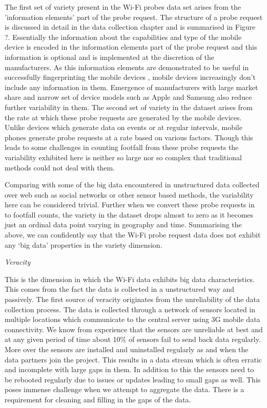 The first set of variety present in the Wi-Fi probes data set arises from the 'information elements' part of the probe request.
The structure of a probe request is discussed in detail in the data collection chapter and is summarised in Figure ?.
Essentially the information about the capabilities and type of the mobile device is encoded in the information elements part of the probe request and this information is optional and is implemented at the discretion of the manufacturers.
As this information elements are demonstrated to be useful in successfully fingerprinting the mobile devices \cite{vanhoef2016}, mobile devices increasingly don't include any information in them.
Emergence of manufacturers with large market share and narrow set of device models such as Apple and Samsung also reduce further variability in them.
The second set of variety in the dataset arises from the rate at which these probe requests are generated by the mobile devices. 
Unlike devices which generate data on events or at regular intervals, mobile phones generate probe requests at a rate based on various factors.
Though this leads to some challenges in counting footfall from these probe requests the variability exhibited here is neither so large nor so complex that traditional methods could not deal with them.

Comparing with some of the big data encountered in unstructured data collected over web such as social networks or other sensor based methods, the variability here can be considered trivial.
Further when we convert these probe requests in to footfall counts, the variety in the dataset drops almost to zero as it becomes just an ordinal data point varying in geography and time.
Summarising the above, we can confidently say that the Wi-Fi probe request data does not exhibit any `big data' properties in the variety dimension.


\vspace{1.5em}\noindent\textit{Veracity}\vspace{0.5em}

This is the dimension in which the Wi-Fi data exhibits big data characteristics.
This comes from the fact the data is collected in a unstructured way and passively.
The first source of veracity originates from the unreliability of the data collection process.
The data is collected through a network of sensors located in multiple locations which communicate to the central server using 3G mobile data connectivity.
We know from experience that the sensors are unreliable at best and at any given period of time about 10\% of sensors fail to send back data regularly.
More over the sensors are installed and uninstalled regularly as and when the data partners join the project.
This results in a data stream which is often erratic and incomplete with large gaps in them.
In addition to this the sensors need to be rebooted regularly due to issues or updates leading to small gaps as well.
This poses immense challenge when we attempt to aggregate the data.
There is a requirement for cleaning and filling in the gaps of the data.

